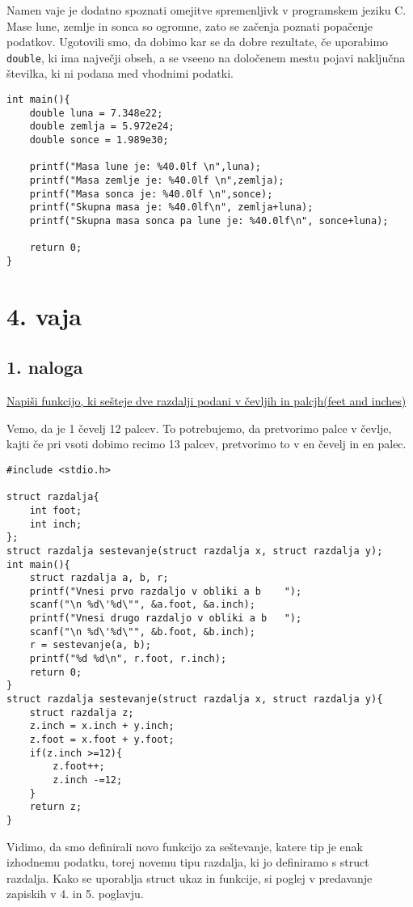 \documentclass[a4paper, 12pt]{article}
\begin{document}
Namen vaje je dodatno spoznati omejitve spremenljivk v programskem jeziku C. Mase lune, zemlje in sonca so ogromne, zato se začenja poznati popačenje podatkov. Ugotovili smo, da dobimo kar se da dobre rezultate, če uporabimo \lstinline|double|, ki ima največji obseh, a se vseeno na določenem mestu pojavi naključna številka, ki ni podana med vhodnimi podatki.

\begin{lstlisting}
int main(){
	double luna = 7.348e22;
	double zemlja = 5.972e24;
	double sonce = 1.989e30;
	
	printf("Masa lune je: %40.0lf \n",luna);
	printf("Masa zemlje je: %40.0lf \n",zemlja);
	printf("Masa sonca je: %40.0lf \n",sonce);
	printf("Skupna masa je: %40.0lf\n", zemlja+luna);
	printf("Skupna masa sonca pa lune je: %40.0lf\n", sonce+luna);
	
	return 0;
}
\end{lstlisting}

\section*{4. vaja}
\subsection*{1. naloga}

\underline{Napiši funkcijo, ki sešteje dve razdalji podani v čevljih in palcjh(feet and inches)}\

Vemo, da je 1 čevelj 12 palcev. To potrebujemo, da pretvorimo palce v čevlje, kajti če pri vsoti dobimo recimo 13 palcev, pretvorimo to v en čevelj in en palec.

\begin{lstlisting}
#include <stdio.h>

struct razdalja{
	int foot;
	int inch;
};
struct razdalja sestevanje(struct razdalja x, struct razdalja y);
int main(){
	struct razdalja a, b, r;
	printf("Vnesi prvo razdaljo v obliki a b	");
	scanf("\n %d\'%d\"", &a.foot, &a.inch);
	printf("Vnesi drugo razdaljo v obliki a b	");
	scanf("\n %d\'%d\"", &b.foot, &b.inch);
	r = sestevanje(a, b);
	printf("%d %d\n", r.foot, r.inch);
	return 0;
}	
struct razdalja sestevanje(struct razdalja x, struct razdalja y){
	struct razdalja z;
	z.inch = x.inch + y.inch;
	z.foot = x.foot + y.foot;
	if(z.inch >=12){
		z.foot++;
		z.inch -=12;
	}
	return z;
}
\end{lstlisting}
Vidimo, da smo definirali novo funkcijo za seštevanje, katere tip je enak izhodnemu podatku, torej novemu tipu razdalja, ki jo definiramo s struct razdalja. Kako se uporablja struct ukaz in funkcije, si poglej v predavanje zapiskih v 4. in 5. poglavju.
\pagebreak
\end{document}

